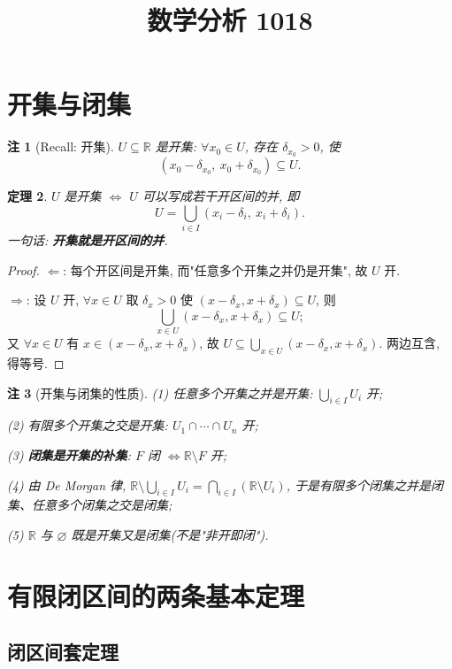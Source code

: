 \documentclass[UTF8,11pt]{ctexart}
\title{数学分析 1018}
\date{}
\theoremstyle{cnthm}
\newtheorem{thm}{定理}[section]
\newtheorem{rem}[thm]{注}
\begin{document}
\maketitle

\section{开集与闭集}

\begin{rem}[Recall: 开集]
$U\subseteq\mathbb{R}$ 是开集: $\forall x_0\in U$, 存在 $\delta_{x_0}>0$, 使
\[
(x_0-\delta_{x_0},\ x_0+\delta_{x_0})\subseteq U .
\]
\end{rem}

\begin{thm}
$U$ 是开集 $\iff$ $U$ 可以写成若干开区间的并, 即
\[
U=\bigcup_{i\in I}(x_i-\delta_i,\ x_i+\delta_i).
\]
一句话: \textbf{开集就是开区间的并}.
\end{thm}

\begin{proof}
$\Leftarrow$: 每个开区间是开集, 而"任意多个开集之并仍是开集", 故 $U$ 开.

$\Rightarrow$: 设 $U$ 开, $\forall x\in U$ 取 $\delta_x>0$ 使 $(x-\delta_x,x+\delta_x)\subseteq U$, 则
\[
\bigcup_{x\in U}(x-\delta_x,x+\delta_x)\subseteq U ;
\]
又 $\forall x\in U$ 有 $x\in(x-\delta_x,x+\delta_x)$, 故 $U\subseteq\bigcup_{x\in U}(x-\delta_x,x+\delta_x)$. 两边互含, 得等号.
\end{proof}

\begin{rem}[开集与闭集的性质]
(1) 任意多个开集之并是开集: $\bigcup_{i\in I}U_i$ 开;

(2) 有限多个开集之交是开集: $U_1\cap\cdots\cap U_n$ 开;

(3) \textbf{闭集是开集的补集}: $F$ 闭 $\iff\mathbb{R}\setminus F$ 开;

(4) 由 De Morgan 律, $\mathbb{R}\setminus\bigcup_{i\in I}U_i=\bigcap_{i\in I}(\mathbb{R}\setminus U_i)$, 于是有限多个闭集之并是闭集、任意多个闭集之交是闭集;

(5) $\mathbb{R}$ 与 $\varnothing$ 既是开集又是闭集(不是"非开即闭").
\end{rem}

\section{有限闭区间的两条基本定理}

\subsection{闭区间套定理}
\end{document}
